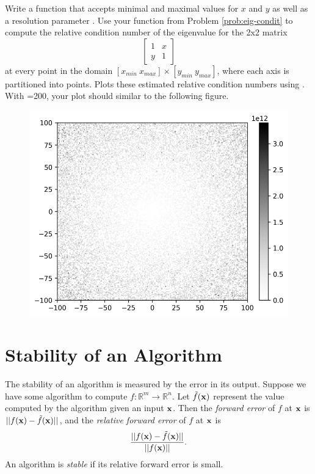 \begin{problem}\label{prob:plot_eigen}
Write a function that accepts minimal and maximal values for $x$ and $y$ as well as a resolution parameter .
Use your function from Problem \ref{prob:eig-condit} to compute the relative condition number of the eigenvalue for the 2x2 matrix
\[
\left[\begin{array}{cc}
1 &  x\\
y & 1\end{array}\right]
\]
at every point in the domain $[x_{min}\ x_{max}]\times [y_{min}\ y_{max}]$, where each axis is partitioned into  points.
Plots these estimated relative condition numbers using .
With =200, your plot should similar to the following figure.

\begin{figure}[H]
    \includegraphics[width=.7\linewidth]{figures/eigenvalue_conditioning.pdf}
\end{figure}
\end{problem}

\section*{Stability of an Algorithm} %

The stability of an algorithm is measured by the error in its output.
Suppose we have some algorithm to compute $f: \mathbb{R}^m \rightarrow \mathbb{R}^n$.
Let $\tilde f(\mathbf{x})$ represent the value computed by the algorithm given an input $\mathbf{x}$.
Then the \emph{forward error} of $f$ at $\mathbf{x}$ is $||f(\mathbf{x})-\tilde f(\mathbf{x})||$, and the \emph{relative forward error} of $f$ at $\mathbf{x}$ is
\[
\frac{||f(\mathbf{x})-\tilde f(\mathbf{x})||}{||f(\mathbf{x})||}.
\]
An algorithm is \emph{stable} if its relative forward error is small.

